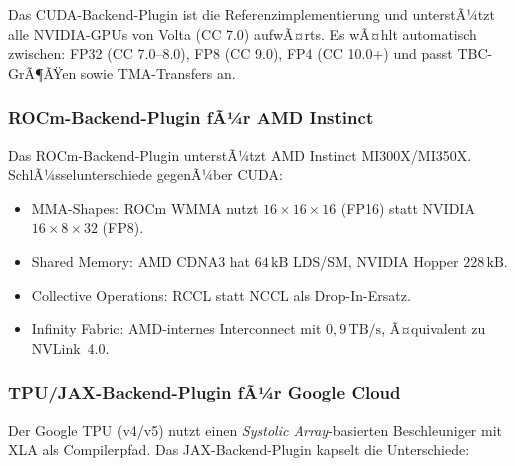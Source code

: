 ﻿\documentclass[12pt,a4paper]{article}
\begin{document}
Das CUDA-Backend-Plugin ist die Referenzimplementierung
und unterstÃ¼tzt alle NVIDIA-GPUs von Volta (CC 7.0)
aufwÃ¤rts. Es wÃ¤hlt automatisch zwischen:
FP32 (CC 7.0--8.0), FP8 (CC 9.0), FP4 (CC 10.0+)
und passt TBC-GrÃ¶ÃŸen sowie TMA-Transfers an.

\subsubsection{ROCm-Backend-Plugin fÃ¼r AMD Instinct}

Das ROCm-Backend-Plugin unterstÃ¼tzt AMD Instinct MI300X/MI350X.
SchlÃ¼sselunterschiede gegenÃ¼ber CUDA:

\begin{itemize}[leftmargin=1.4em, itemsep=1pt]
  \item MMA-Shapes: ROCm WMMA nutzt $16 \times 16 \times 16$ (FP16)
        statt NVIDIA $16 \times 8 \times 32$ (FP8).
  \item Shared Memory: AMD CDNA3 hat $64\,\text{kB}$ LDS/SM,
        NVIDIA Hopper $228\,\text{kB}$.
  \item Collective Operations: RCCL statt NCCL als Drop-In-Ersatz.
  \item Infinity Fabric: AMD-internes Interconnect mit
        $0{,}9\,\text{TB/s}$, Ã¤quivalent zu NVLink~4.0.
\end{itemize}

\subsubsection{TPU/JAX-Backend-Plugin fÃ¼r Google Cloud}

Der Google TPU (v4/v5) nutzt einen \emph{Systolic Array}-basierten
Beschleuniger mit XLA als Compilerpfad.
Das JAX-Backend-Plugin kapselt die Unterschiede:
\end{document}
